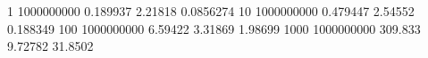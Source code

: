 1 1000000000 0.189937 2.21818 0.0856274
10 1000000000 0.479447 2.54552 0.188349
100 1000000000 6.59422 3.31869 1.98699
1000 1000000000 309.833 9.72782 31.8502
